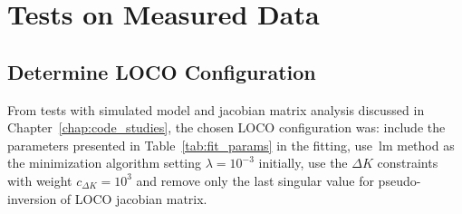 

\section{Tests on Measured Data}

\subsection{Determine LOCO Configuration}\label{subsec:loco_config}
From tests with simulated model and jacobian matrix analysis discussed in Chapter~\ref{chap:code_studies}, the chosen LOCO configuration was: include the parameters presented in Table~\ref{tab:fit_params} in the fitting, use~\gls{lm} method as the minimization algorithm setting $\lambda = 10^{-3}$ initially, use the $\Delta K$ constraints with weight $c_{\Delta K} = 10^{3}$ and remove only the last singular value for pseudo-inversion of LOCO jacobian matrix. 

